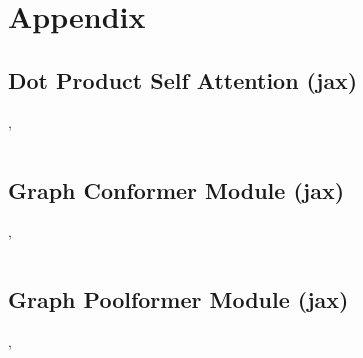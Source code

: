 \chapter{Appendix}
\label{sec:appendix}



% 

\newpage
\section{Dot Product Self Attention (jax)} \label{appendix:attention}
    \cite{selfPhysics}, 
    \inputminted[firstline=149, lastline=169]{python}{./../physics-code/models/metaformer.py}

\section{Graph Conformer Module (jax)} \label{appendix:graph-conformer}
    \cite{selfPhysics}, 
    \inputminted[firstline=242, lastline=284]{python}{./../physics-code/models/metaformer.py}

\newpage
\section{Graph Poolformer Module (jax)} \label{appendix:graph-poolformer}
    \cite{selfPhysics}, 
    \inputminted[firstline=211, lastline=239]{python}{./../physics-code/models/metaformer.py}
    
